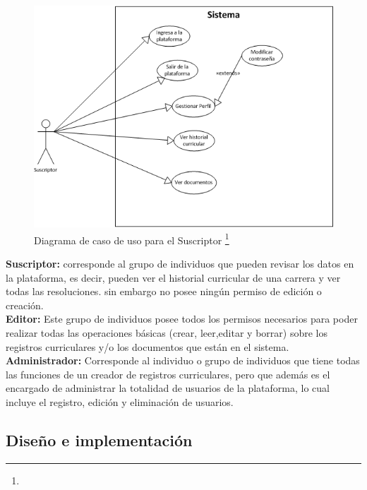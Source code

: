 	\begin{figure}[H]
		\centering
		\includegraphics[width=1\textwidth]{images/Capitulo_3/caso_uso_Suscriptor.png}
		\caption[Diagrama de caso de uso para el Suscriptor]{Diagrama de caso de uso para el Suscriptor \footnote{}}
		\label{caso_uso_Suscriptor}
	\end{figure}
	
	 \label{usuarios_Sistema}
	
	
	\textbf{Suscriptor:} corresponde al grupo de individuos que pueden revisar los datos en la plataforma, es decir, pueden ver el historial curricular de una carrera y ver todas las resoluciones. sin embargo no posee ningún permiso de edición o creación.
	\\
	
	\textbf{Editor:} Este grupo de individuos posee todos los permisos necesarios para poder realizar todas las operaciones básicas (crear, leer,editar y borrar) sobre los registros curriculares y/o los documentos que están en el sistema.
	\\
	
	\textbf{Administrador:} Corresponde al individuo o grupo de individuos que tiene todas las
	funciones de un creador de registros curriculares, pero que además es el encargado de administrar la
	totalidad de usuarios de la plataforma, lo cual incluye el registro, edición y eliminación
	de usuarios.
	
	
	
\subsection{Diseño e implementación}


